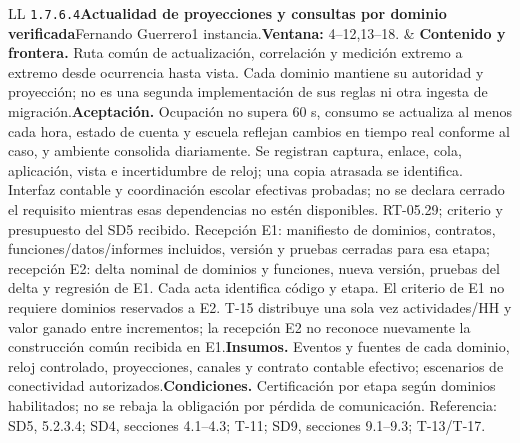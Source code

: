 \begin{longtable}{L{\tabcolsep\relax}L{\tabcolsep\relax}}
\texttt{1.\allowbreak{}7.\allowbreak{}6.\allowbreak{}4}\newline{}\textbf{Actualidad de proyecciones y consultas por dominio verificada}\newline{}Fernando Guerrero\newline{}1 instancia.\newline{}\textbf{Ventana:} 4--12,13--18. & \textbf{Contenido y frontera.} Ruta común de actualización, correlación y medición extremo a extremo desde ocurrencia hasta vista. Cada dominio mantiene su autoridad y proyección; no es una segunda implementación de sus reglas ni otra ingesta de migración.\newline{}\textbf{Aceptación.} Ocupación no supera 60 s, consumo se actualiza al menos cada hora, estado de cuenta y escuela reflejan cambios en tiempo real conforme al caso, y ambiente consolida diariamente. Se registran captura, enlace, cola, aplicación, vista e incertidumbre de reloj; una copia atrasada se identifica. Interfaz contable y coordinación escolar efectivas probadas; no se declara cerrado el requisito mientras esas dependencias no estén disponibles. RT-05.29; criterio y presupuesto del SD5 recibido. Recepción E1: manifiesto de dominios, contratos, funciones/datos/informes incluidos, versión y pruebas cerradas para esa etapa; recepción E2: delta nominal de dominios y funciones, nueva versión, pruebas del delta y regresión de E1. Cada acta identifica código y etapa. El criterio de E1 no requiere dominios reservados a E2. T-15 distribuye una sola vez actividades/HH y valor ganado entre incrementos; la recepción E2 no reconoce nuevamente la construcción común recibida en E1.\newline{}\textbf{Insumos.} Eventos y fuentes de cada dominio, reloj controlado, proyecciones, canales y contrato contable efectivo; escenarios de conectividad autorizados.\newline{}\textbf{Condiciones.} Certificación por etapa según dominios habilitados; no se rebaja la obligación por pérdida de comunicación. Referencia: SD5, 5.2.3.4; SD4, secciones 4.1--4.3; T-11; SD9, secciones 9.1--9.3; T-13/T-17.\\\hline

\end{longtable}
